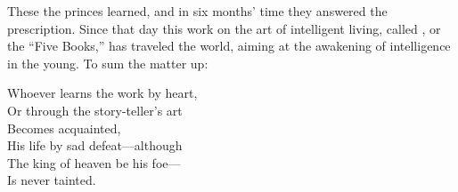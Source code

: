 These the princes learned, and in six months' time they answered the
prescription. Since that day this work on the art of intelligent
living, called , or the ``Five Books,'' has traveled the
world, aiming at the awakening of intelligence in the young. To sum
the matter up:

\begin{pverse}[001]
Whoever learns the work by heart,\\
Or through the story-teller's art\\
     Becomes acquainted,\\
His life by sad defeat---although\\
The king of heaven be his foe---\\
     Is never tainted.
\end{pverse}




